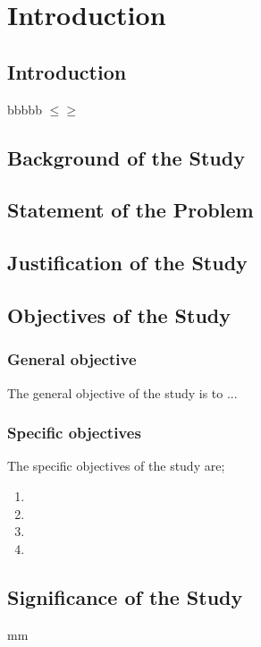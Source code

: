 \chapter{Introduction} 
\label{Chapter1} 
\section{Introduction}
\citet{Rigaill2010} bbbbb \citep{Rigaill2010} $\le \ge$ 

\section{Background of the Study}

\section{Statement of the Problem}

\section{Justification of the Study}

\section{Objectives of the Study}
\subsection{General objective}
The general objective of the study is to ... 

\subsection{Specific objectives}
The specific objectives of the study are;
\begin{enumerate}[label=\roman*.]
	\item 
	\item 
	\item 	
	\item 
\end{enumerate}

\section{Significance of the Study}


mm
